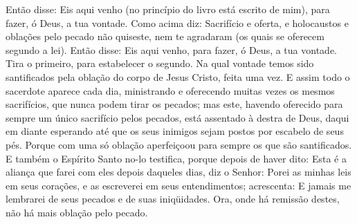 Então disse: Eis aqui venho (no princípio do livro está escrito de
mim), para fazer, ó Deus, a tua vontade. Como acima diz:
Sacrifício e oferta, e holocaustos e oblações pelo pecado não
quiseste, nem te agradaram (os quais se oferecem segundo a lei).
Então disse: Eis aqui venho, para fazer, ó Deus, a tua vontade.
Tira o primeiro, para estabelecer o segundo. Na qual vontade
temos sido santificados pela oblação do corpo de Jesus Cristo, feita
uma vez. E assim todo o sacerdote aparece cada dia,
ministrando e oferecendo muitas vezes os mesmos sacrifícios, que
nunca podem tirar os pecados; mas este, havendo oferecido
para sempre um único sacrifício pelos pecados, está assentado à
destra de Deus, daqui em diante esperando até que os seus
inimigos sejam postos por escabelo de seus pés. Porque com
uma só oblação aperfeiçoou para sempre os que são santificados.
E também o Espírito Santo no-lo testifica, porque depois de
haver dito: Esta é a aliança que farei com eles depois
daqueles dias, diz o Senhor: Porei as minhas leis em seus corações,
e as escreverei em seus entendimentos; acrescenta: E jamais
me lembrarei de seus pecados e de suas iniqüidades. Ora, onde
há remissão destes, não há mais oblação pelo pecado.

